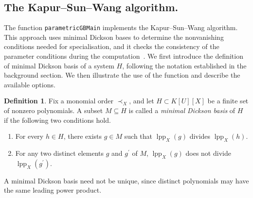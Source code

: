 \documentclass[11pt]{amsart}
\theoremstyle{plain}
\theoremstyle{definition}
\newtheorem{definition}[theorem]{Definition}
\theoremstyle{remark}
\begin{document}
\subsection{The Kapur--Sun--Wang algorithm.}

The function \texttt{parametricGBMain} implements the Kapur--Sun--Wang algorithm. This approach uses minimal Dickson bases to determine
the nonvanishing conditions needed for specialisation,
and it checks the consistency of the parameter conditions
during the computation~\cite{KAPUR201327}. We first introduce the definition of minimal Dickson basis of a system $H$, following the notation established in the background section. We then illustrate the use of the function and describe the available options.

\begin{definition}\cite[Definition~4.1]{KAPUR201327}
Fix a monomial order $\prec_X$, and let
$H \subset K[U][X]$ be a finite set of nonzero polynomials.
A subset $M \subseteq H$ is called a \emph{minimal Dickson basis}
of $H$ if the following two conditions hold.
\begin{enumerate}
    \item For every $h \in H$, there exists $g \in M$ such that
    $\operatorname{lpp}_X(g)$ divides $\operatorname{lpp}_X(h)$.
    \item For any two distinct elements $g$ and $g^\prime$ of $M$,
    $\operatorname{lpp}_X(g)$ does not divide
    $\operatorname{lpp}_X(g^\prime)$.
\end{enumerate}

A minimal Dickson basis need not be unique, since distinct
polynomials may have the same leading power product.
\end{definition}
\end{document}
